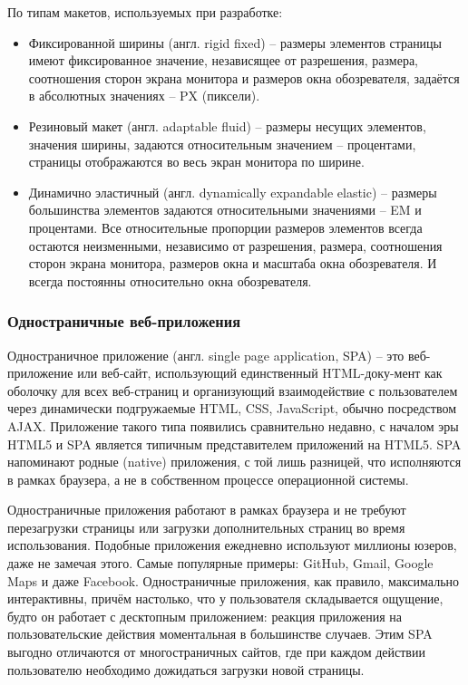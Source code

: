 По типам макетов, используемых при разработке:
\begin{itemize}
\item Фиксированной ширины (англ. rigid fixed) -- размеры элементов страницы имеют фиксированное значение, независящее от разрешения, размера, соотношения сторон экрана
монитора и размеров окна обозревателя, задаётся в абсолютных значениях -- PX (пиксели).
\item Резиновый макет (англ. adaptable fluid) -- размеры несущих элементов, значения ширины, задаются относительным значением -- процентами,
страницы отображаются во весь экран монитора по ширине.
\item Динамично эластичный (англ. dynamically expandable elastic) -- размеры большинства элементов задаются относительными значениями -- EM
и процентами. Все относительные пропорции размеров элементов всегда остаются неизменными, независимо от разрешения, размера, соотношения
сторон экрана монитора, размеров окна и масштаба окна обозревателя. И всегда постоянны относительно окна обозревателя.
\end{itemize}

\subsubsection{Одностраничные веб-приложения}
\label{sub:domain:overview_website:spa}
Одностраничное приложение (англ. single page application, SPA) -- это веб-приложение или веб-сайт, использующий единственный HTML-доку-мент как оболочку для всех веб-страниц 
и организующий взаимодействие с пользователем через динамически подгружаемые HTML, CSS, JavaScript, обычно посредством AJAX. Приложение такого типа появились 
сравнительно недавно, с началом эры HTML5 и SPA является типичным представителем приложений на HTML5. SPA напоминают родные (native) приложения, с той лишь разницей, 
что исполняются в рамках браузера, а не в собственном процессе операционной системы.

Одностраничные приложения работают в рамках браузера и не требуют перезагрузки страницы или загрузки дополнительных страниц во время использования. Подобные 
приложения ежедневно используют миллионы юзеров, даже не замечая этого. Самые популярные примеры:  GitHub, Gmail, Google Maps и даже Facebook. Одностраничные приложения, 
как правило, максимально интерактивны, причём настолько, что у пользователя складывается ощущение, будто он работает с десктопным приложением: реакция приложения 
на пользовательские действия моментальная в большинстве случаев. Этим SPA выгодно отличаются от многостраничных сайтов, где при каждом действии пользователю необходимо 
дожидаться загрузки новой страницы.

